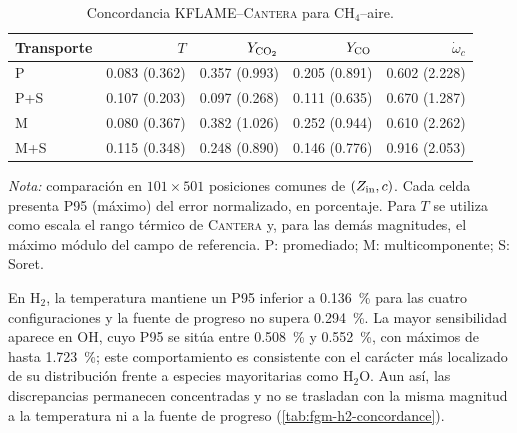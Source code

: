 \documentclass[12pt,a4paper,twoside,openany]{book}
\newcommand{\KFLAME}{\textsc{KFLAME}\xspace}
\newcommand{\Cantera}{\textsc{Cantera}\xspace}
\begin{document}
\begin{table}[H]
\centering
\small
\caption{Concordancia \KFLAME{}--\Cantera{} para CH$_4$--aire.}
\label{tab:fgm-ch4-concordance}
\begin{tabular}{lrrrr}
\toprule
Transporte &
\(T\) &
\(Y_{\rm CO_2}\) &
\(Y_{\rm CO}\) &
\(\dot{\omega}_c\) \\
\midrule
P
& 0.083 (0.362)
& 0.357 (0.993)
& 0.205 (0.891)
& 0.602 (2.228) \\
P+S
& 0.107 (0.203)
& 0.097 (0.268)
& 0.111 (0.635)
& 0.670 (1.287) \\
M
& 0.080 (0.367)
& 0.382 (1.026)
& 0.252 (0.944)
& 0.610 (2.262) \\
M+S
& 0.115 (0.348)
& 0.248 (0.890)
& 0.146 (0.776)
& 0.916 (2.053) \\
\bottomrule
\end{tabular}

\vspace{0.4em}
\begin{minipage}{0.92\textwidth}
\footnotesize
\textit{Nota:} comparación en \(101\times501\) posiciones comunes de
\((Z_{\rm in},c)\). Cada celda presenta P95 (máximo) del error normalizado,
en porcentaje. Para \(T\) se utiliza como escala el rango térmico de
\Cantera{} y, para las demás magnitudes, el máximo módulo del campo de
referencia. P: promediado; M: multicomponente; S: Soret.
\end{minipage}
\end{table}

En H$_2$, la temperatura mantiene un P95 inferior a
\SI{0.136}{\percent} para las cuatro configuraciones y la fuente de progreso
no supera \SI{0.294}{\percent}. La mayor sensibilidad aparece en OH, cuyo P95
se sitúa entre \SI{0.508}{\percent} y \SI{0.552}{\percent}, con máximos de
hasta \SI{1.723}{\percent}; este comportamiento es consistente con el carácter
más localizado de su distribución frente a especies mayoritarias como
H$_2$O. Aun así, las discrepancias permanecen concentradas y no se trasladan
con la misma magnitud a la temperatura ni a la fuente de progreso
(\cref{tab:fgm-h2-concordance}).
\end{document}
